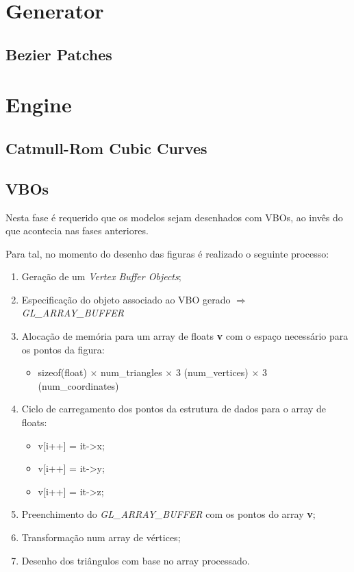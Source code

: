 \documentclass[a4paper]{article}
\begin{document}
\section{Generator}
\label{sec:generator}

\subsection{Bezier Patches}
\label{sec:bezier}



\section{Engine}
\label{sec:engine}

\subsection{Catmull-Rom Cubic Curves}
\label{sec:catmullrom}


\subsection{VBOs}
\label{sec:vbos}

Nesta fase é requerido que os modelos sejam desenhados com VBOs, ao invês do que acontecia nas fases anteriores.

Para tal, no momento do desenho das figuras é realizado o seguinte processo:

\begin{enumerate}
  \item Geração de um \textit{Vertex Buffer Objects};
  \item Especificação do objeto associado ao VBO gerado $\Rightarrow$ \textit{GL\_ARRAY\_BUFFER}
  \item Alocação de memória para um array de floats \textbf{v} com o espaço necessário para os pontos da figura:
    \begin{itemize}
      \item sizeof(float) $\times$ num\_triangles $\times$ 3 (num\_vertices) $\times$ 3 (num\_coordinates)
    \end{itemize}
  \item Ciclo de carregamento dos pontos da estrutura de dados para o array de floats:
    \begin{itemize}
      \item v[i++] = it->x;
      \item v[i++] = it->y;
      \item v[i++] = it->z;
    \end{itemize}
  \item Preenchimento do \textit{GL\_ARRAY\_BUFFER} com os pontos do array \textbf{v};
  \item Transformação num array de vértices;
  \item Desenho dos triângulos com base no array processado.
\end{enumerate}
\end{document}
